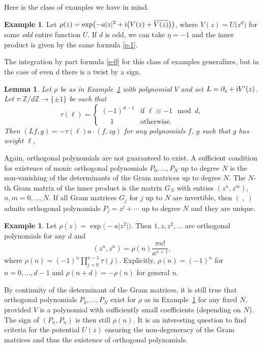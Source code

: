 \documentclass[10pt,a4paper]{amsart}
\numberwithin{equation}{section}
\newtheorem{Lemma}[Theorem]{Lemma}
\theoremstyle{definition}
\newtheorem{Example}[Theorem]{Example}
\begin{document}
Here is the class of examples we have in mind.

\begin{Example}\label{ex-1}
 Let $\rho(z)=\exp\bigl(-a|z|^2+{\rm i}\bigl(V(z)+\overline {V(z)}\bigr)\bigr)$, where $V(z)=U\bigl(z^d\bigr)$ for some {\em odd} entire function $U$. If $d$ is odd, we can take $\eta =-1$ and the inner product is given by the same formula \eqref{e-1}.
\end{Example}
The integration by part formula \eqref{e-0} for this class of examples generalizes, but in the case of even $d$ there is a twist by a sign.

\begin{Lemma}
 Let $\rho$ be as in Example~{\rm\ref{ex-1}} with polynomial $V$ and set $L=\partial_z + {\rm i}V'(z)$.
 Let $\tau\colon\mathbb Z/d\mathbb Z\to\{\pm1\}$ be such that
 \[
 \tau(\ell)=\begin{cases}
 (-1)^{d-1}& \text{if $\ell\equiv -1\mod{d}$},
 \\
 \phantom{-}1& \text{otherwise.}
 \end{cases}
 \]
 Then
 $ (Lf,g)=-\tau(\ell)a\cdot(f,zg)$ for any polynomials $f$, $g$ such that $g$ has weight $\ell$,
\end{Lemma}
Again, orthogonal polynomials are not guaranteed to exist. A sufficient condition for existence of monic orthogonal polynomials $P_0,\dots, P_N$ up to degree $N$ is the non-vanishing of the determinants of the Gram matrices up to degree $N$. The $N$-th Gram matrix of the inner product is the matrix $G_N$ with entries $(z^n,z^m)$, $n,m=0,\dots, N$. If all Gram matrices $G_j$ for $j$ up to $N$ are invertible, then $(\ ,\ )$ admits orthogonal polynomials $P_j=z^j+\cdots$ up to degree $N$ and they are unique.

\begin{Example}\label{ex-2}
 Let $\rho(z)=\exp\bigl(-a\big|z^2\big|\bigr)$. Then $1,z,z^2,\dots$ are orthogonal polynomials for any $d$ and
 \[
 (z^n,z^n)=\rho(n)\frac{\pi n!}{a^{n+1}},
 \]
 where $\rho(n)=(-1)^n\prod_{j=0}^{n-1}\tau(j)$. Explicitly, $\rho(n)=(-1)^n$ for $n=0,\dots,d-1$ and $\rho(n+d)=-\rho(n)$ for general $n$.
\end{Example}
By continuity of the determinant of the Gram matrices, it is still true that orthogonal polynomials $P_0,\dots, P_N$ exist for $\rho$ as in Example~\ref{ex-1} for any fixed $N$, provided $V$ is a polynomial with sufficiently small coefficients (depending on $N$). The sign of $(P_n,P_n)$ is then still $\rho(n)$. It is an interesting question to find criteria for the potential $U(z)$ ensuring the non-degeneracy of the Gram matrices and thus the existence of orthogonal polynomials.
\end{document}

